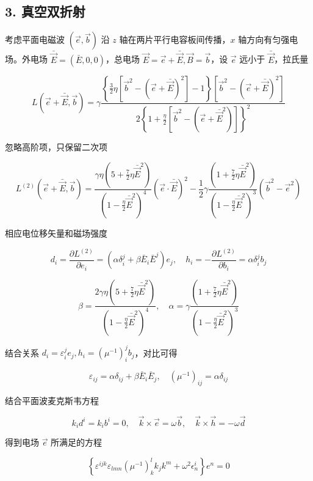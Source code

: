 \documentclass[aps,prl,preprint,groupedaddress,showkeys]{revtex4-2}
\begin{document}
\subsection{3. 真空双折射}

考虑平面电磁波 $\left(\vec{e},\vec{b}\right) $ 沿 $z $ 轴在两片平行电容板间传播，$x $ 轴方向有匀强电场。外电场 $\bar{\vec{E}}=(\bar{E},0,0) $，总电场 $\vec{E}=\vec{e}+\bar{\vec{E}},\vec{B}=\vec{b} $，设 $\vec{e} $ 远小于 $\bar{\vec{E}} $，拉氏量

$$
L\left(\vec{e}+\bar{\vec{E}},\vec{b} \right)
=\gamma\frac{\left\{\frac{3 }{2 } \eta\left[\vec{b}^2-\left(\vec{e}+\bar{\vec{E}} \right)^2 \right] - 1 \right\}\left[\vec{b}^2-\left(\vec{e}+\bar{\vec{E}} \right)^2 \right] }{2\left\{1+\frac{\eta }{2 } \left[\vec{b}^2-\left(\vec{e} + \bar{\vec{E}}^2 \right) \right] \right\}^2 } 
$$

忽略高阶项，只保留二次项

$$
L^{(2)}(\vec{e}+\bar{\vec{E}},\vec{b})
=\frac{\gamma\eta\left(5+\frac{7 }{2 } \eta \bar{\vec{E}}^2 \right) }{\left(1-\frac{\eta }{2 } \bar{\vec{E}}^2 \right)^4 }\left(\vec{e}\cdot\bar{\vec{E}} \right)^2 - \frac{1 }{2 } \gamma \frac{\left(1+\frac{7 }{2 } \eta \bar{\vec{E}}^2 \right) }{\left(1-\frac{\eta }{2 } \bar{\vec{E}}^2 \right)^3 }\left(\vec{b}^2-\vec{e}^2 \right) 
$$

相应电位移矢量和磁场强度

$$
d_i = \frac{\partial L^{(2)} }{\partial e_i } = \left(\alpha\delta_i^j+\beta\bar{E}_i\bar{E}^j \right)e_j,\quad
h_i
=-\frac{\partial L^{(2)} }{\partial b_i } 
=\alpha\delta_i^j b_j 
$$

$$
\beta = \frac{2\gamma \eta\left(5+\frac{7 }{2 } \eta \bar{\vec{E}}^2 \right) }{\left(1-\frac{\eta }{2 } \bar{\vec{E}}^2 \right)^4 },\quad 
\alpha = \gamma \frac{\left(1+\frac{7 }{2 }\eta\bar{\vec{E}}^2 \right)  }{\left(1-\frac{\eta }{2 } \bar{\vec{E}}^2 \right)^3 }
$$

结合关系 $d_i=\varepsilon_i^j e_j,h_i=\left(\mu^{-1} \right)_i^j b_j $，对比可得
    
$$
\varepsilon_{ij} = \alpha\delta_{ij} + \beta\bar{E}_i\bar{E}_j ,\quad
\left(\mu^{-1} \right)_{ij} = \alpha\delta_{ij} 
$$

结合平面波麦克斯韦方程

$$
k_i d^i = k_i b^i = 0,\quad
\vec{k}\times\vec{e} = \omega\vec{b},\quad
\vec{k}\times\vec{h} = -\omega\vec{d} 
$$

得到电场 $\vec{e}$ 所满足的方程

$$
\left\{\varepsilon^{ijk}\varepsilon_{lmn} \left(\mu^{-1} \right)_k^l k_j k^m+\omega^2\epsilon_n^i \right\}e^n = 0
$$
\end{document}

